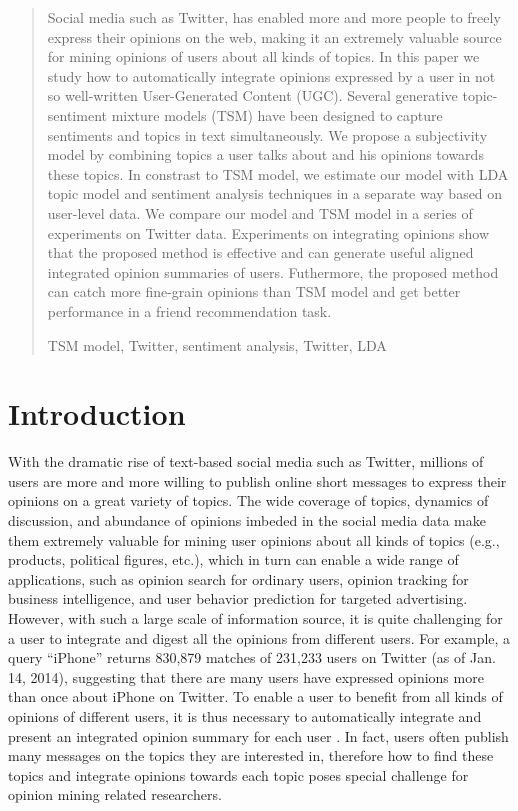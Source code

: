\documentclass[runningheads,a4paper]{llncs}
\newcommand{\keywords}[1]{\par\addvspace\baselineskip
\noindent\keywordname\enspace\ignorespaces#1}
\begin{document}
\begin{abstract}
Social media such as Twitter, has enabled more and more people to freely express their opinions on the web, making it an extremely valuable source for mining opinions of users about all kinds of topics. In this paper we study how to automatically integrate opinions expressed by a user in not so well-written User-Generated Content (UGC). Several generative topic-sentiment mixture models (TSM) have been designed to capture sentiments and topics in text simultaneously. We propose a subjectivity model by combining topics a user talks about and his opinions towards these topics. In constrast to TSM model, we estimate our model with LDA topic model and sentiment analysis techniques in a separate way based on user-level data. We compare our model and TSM model in a series of experiments on Twitter data. Experiments on integrating opinions show that the proposed method is effective and can generate useful aligned integrated opinion summaries of users. Futhermore, the proposed method can catch more fine-grain opinions than TSM model and get better performance in a friend recommendation task. 
\keywords{TSM model, Twitter, sentiment analysis, Twitter, LDA}
\end{abstract}

\section{Introduction}

With the dramatic rise of text-based social media such as Twitter, millions of users are more and more willing to publish online short messages to express their opinions on a great variety of topics. The wide coverage of topics, dynamics of discussion, and abundance of opinions imbeded in the social media data make them extremely valuable for mining user opinions about all kinds of topics (e.g., products, political figures, etc.), which in turn can enable a wide range of applications, such as opinion search for ordinary users, opinion tracking for business intelligence, and user behavior prediction for targeted advertising. 
However, with such a large scale of information source, it is quite challenging for a user to integrate and digest all the opinions from different users. For example, a query ``iPhone'' returns 830,879 matches of 231,233 users on Twitter (as of Jan. 14, 2014), suggesting that there are many users have expressed opinions more than once about iPhone on Twitter. To enable a user to benefit from all kinds of opinions of different users, it is thus necessary to automatically integrate and present an integrated opinion summary for each user \cite{lu2008opinion}. In fact, users often publish many messages on the topics they are interested in, therefore how to find these topics and integrate opinions towards each topic poses special challenge for opinion mining related researchers.
\end{document}
